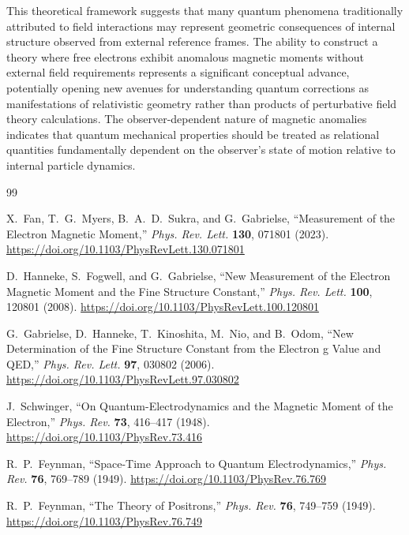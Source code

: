 \documentclass[%
 reprint,
 amsmath,amssymb,
 aps,
]{revtex4-1}
\numberwithin{equation}{section}%
\begin{document}
This theoretical framework suggests that many quantum phenomena traditionally attributed to field interactions may represent geometric consequences of internal structure observed from external reference frames. The ability to construct a theory where free electrons exhibit anomalous magnetic moments without external field requirements represents a significant conceptual advance, potentially opening new avenues for understanding quantum corrections as manifestations of relativistic geometry rather than products of perturbative field theory calculations. The observer-dependent nature of magnetic anomalies indicates that quantum mechanical properties should be treated as relational quantities fundamentally dependent on the observer's state of motion relative to internal particle dynamics.

\begin{thebibliography}{99}

X.~Fan, T.~G.~Myers, B.~A.~D.~Sukra, and G.~Gabrielse, 
``Measurement of the Electron Magnetic Moment,'' 
\textit{Phys. Rev. Lett.} \textbf{130}, 071801 (2023). 
\href{https://doi.org/10.1103/PhysRevLett.130.071801}{https://doi.org/10.1103/PhysRevLett.130.071801}

D.~Hanneke, S.~Fogwell, and G.~Gabrielse, 
``New Measurement of the Electron Magnetic Moment and the Fine Structure Constant,'' 
\textit{Phys. Rev. Lett.} \textbf{100}, 120801 (2008). 
\href{https://doi.org/10.1103/PhysRevLett.100.120801}{https://doi.org/10.1103/PhysRevLett.100.120801}

G.~Gabrielse, D.~Hanneke, T.~Kinoshita, M.~Nio, and B.~Odom, 
``New Determination of the Fine Structure Constant from the Electron g Value and QED,'' 
\textit{Phys. Rev. Lett.} \textbf{97}, 030802 (2006). 
\href{https://doi.org/10.1103/PhysRevLett.97.030802}{https://doi.org/10.1103/PhysRevLett.97.030802}

J.~Schwinger, 
``On Quantum-Electrodynamics and the Magnetic Moment of the Electron,'' 
\textit{Phys. Rev.} \textbf{73}, 416--417 (1948). 
\href{https://doi.org/10.1103/PhysRev.73.416}{https://doi.org/10.1103/PhysRev.73.416}

R.~P.~Feynman, 
``Space-Time Approach to Quantum Electrodynamics,'' 
\textit{Phys. Rev.} \textbf{76}, 769--789 (1949). 
\href{https://doi.org/10.1103/PhysRev.76.769}{https://doi.org/10.1103/PhysRev.76.769}

R.~P.~Feynman, 
``The Theory of Positrons,'' 
\textit{Phys. Rev.} \textbf{76}, 749--759 (1949). 
\href{https://doi.org/10.1103/PhysRev.76.749}{https://doi.org/10.1103/PhysRev.76.749}


\end{thebibliography}
\end{document}
